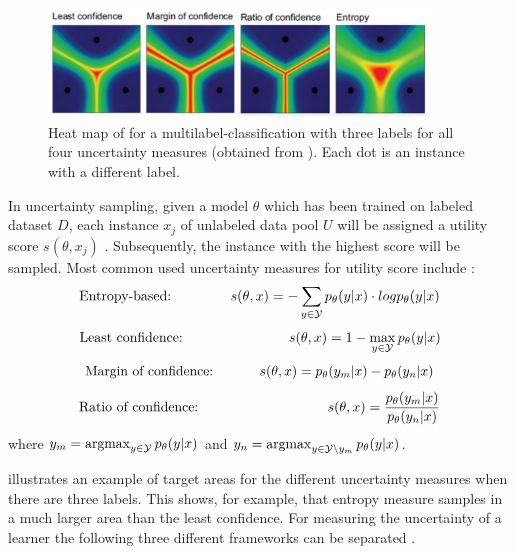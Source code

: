 \begin{figure}[H]
  \centering
    \includegraphics[width=0.9\textwidth]{figures/heat_map.pdf}
  \caption{Heat map of for a multilabel-classification with three labels for all four uncertainty measures (obtained from \cite{human-in-the-loop}).
  Each dot is an instance with a different label.}
  \label{fig:uncertainty_sampling_heatmap}
\end{figure}
\clearpage
In uncertainty sampling, given a model $\theta$ which has been trained on labeled dataset $D$, each instance $x_j$ of unlabeled data pool $U$ will be assigned a utility score $s(\theta, x_j)$ \cite{nguyen2021howtomeasure}.
Subsequently, the instance with the highest score will be sampled.
Most common used uncertainty measures for utility score include \cite{human-in-the-loop}:
\begin{equation}
    \text{Entropy-based:}\hspace{15mm} \label{eqn:entropy_def}
     s(\theta, x) = - \sum_{y \in \mathcal{Y}}{p_{\theta}(y | x) \cdot log p_{\theta}(y|x)}
\end{equation}
\begin{equation}
    \text{Least confidence:}\hspace{27mm} \label{eqn:least_confidence_def}
     s(\theta, x) = 1 - \max_{y \in \mathcal{Y}}{p_{\theta}(y | x)}
\end{equation}
\begin{equation}
    \text{Margin of confidence:}\hspace{12mm} \label{eqn:margin_of_confidence_def}
    s(\theta, x) = p_{\theta}(y_m | x) - p_{\theta}(y_n|x)
\end{equation}
\begin{equation} \label{eqn:ratio_of_confidence_def}
    \text{Ratio of confidence:}\hspace{33mm}
    s(\theta, x) = \frac{p_{\theta}(y_m | x)}{p_{\theta}(y_n|x)}
\end{equation}
where
$y_m = \operatorname*{argmax}_{y \in \mathcal{Y}} p_{\theta}(y | x)$ 
and 
$y_n = \operatorname*{argmax}_{y \in \mathcal{Y} \setminus y_m}{p_{\theta}(y | x)}$.

 illustrates an example of target areas for the different uncertainty measures when there are three labels.
This shows, for example, that entropy measure samples in a much larger area than the least confidence.
For measuring the uncertainty of a learner the following three different frameworks can be separated \cite{nguyen2021howtomeasure}.
%




